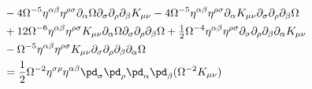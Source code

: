 \documentclass[10pt,letterpaper]{article}
\begin{document}
\begin{align}
 &- 4\Omega^{-5} \eta^{\alpha \beta} \eta^{\rho \sigma} \partial_{\alpha}\Omega \partial_{\sigma}\partial_{\rho}\partial_{\beta}K_{\mu \nu}- 4 \Omega^{-5}\eta^{\alpha \beta} \eta^{\rho \sigma} \partial_{\alpha}K_{\mu \nu} \partial_{\sigma}\partial_{\rho}\partial_{\beta}\Omega\nonumber \\
 & + 12\Omega^{-6} \eta^{\alpha \beta} \eta^{\rho \sigma} K_{\mu \nu} \partial_{\alpha}\Omega \partial_{\sigma}\partial_{\rho}\partial_{\beta}\Omega + \tfrac{1}{2}\Omega^{-4} \eta^{\alpha \beta} \eta^{\rho \sigma} \partial_{\sigma}\partial_{\rho}\partial_{\beta}\partial_{\alpha}K_{\mu \nu}\nonumber \\
 &-  \Omega^{-5}\eta^{\alpha \beta} \eta^{\rho \sigma} K_{\mu \nu} \partial_{\sigma}\partial_{\rho}\partial_{\beta}\partial_{\alpha}\Omega \nonumber \\
&= \frac12 \Omega^{-2} \eta^{\sigma\rho}\eta^{\alpha\beta}\pd_\sigma\pd_\rho\pd_\alpha \pd_\beta (\Omega^{-2}K_{\mu\nu}) 
\end{align}

%
\end{document}
